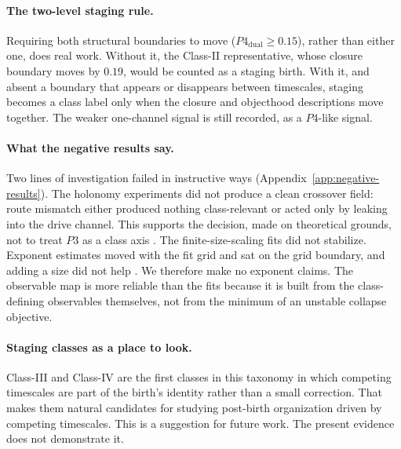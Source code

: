 \paragraph{The two-level staging rule.} Requiring both structural boundaries to move ($P4_{\mathrm{dual}}\ge0.15$), rather than either one, does real work. Without it, the Class-II representative, whose closure boundary moves by $0.19$, would be counted as a staging birth. With it, and absent a boundary that appears or disappears between timescales, staging becomes a class label only when the closure and objecthood descriptions move together. The weaker one-channel signal is still recorded, as a $P4$-like signal.

\paragraph{What the negative results say.} Two lines of investigation failed in instructive ways (Appendix~\ref{app:negative-results}). The holonomy experiments did not produce a clean crossover field: route mismatch either produced nothing class-relevant or acted only by leaking into the drive channel. This supports the decision, made on theoretical grounds, not to treat $P3$ as a class axis \cite{sixbirds_protocol_trap,liang_pigolotti_2023}. The finite-size-scaling fits did not stabilize. Exponent estimates moved with the fit grid and sat on the grid boundary, and adding a size did not help \cite{fisher_barber_1972,binder_1981_prl,ardourel_bangu_2023}. We therefore make no exponent claims. The observable map is more reliable than the fits because it is built from the class-defining observables themselves, not from the minimum of an unstable collapse objective.

\paragraph{Staging classes as a place to look.} Class-III and Class-IV are the first classes in this taxonomy in which competing timescales are part of the birth's identity rather than a small correction. That makes them natural candidates for studying post-birth organization driven by competing timescales. This is a suggestion for future work. The present evidence does not demonstrate it.

